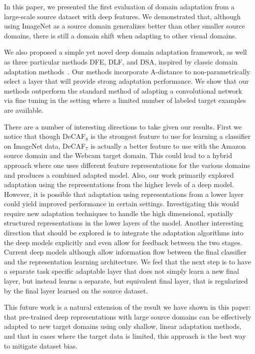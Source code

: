 In this paper, we presented the first evaluation of domain adaptation from a
large-scale source dataset with deep features. We demonstrated that, although
using ImageNet as a source domain generalizes better than other smaller source
domains, there is still a domain shift when adapting to other visual domains.

We also proposed a simple yet novel deep domain adaptation framework, as well as
three particular methods DFE, DLF, and DSA, inspired by classic domain
adaptation methods~\cite{daume, sa}. Our methods incorporate A-distance to
non-parametrically select a layer that will provide strong adaptation
performance. We show that our methods outperform the standard method of adapting
a convolutional network via fine tuning in the setting where a limited number of
labeled target examples are available.


There are a number of interesting directions to take given our results. First we
notice that though DeCAF$_8$ is the strongest feature to use for learning a
classifier on ImageNet data, DeCAF$_7$ is actually a better feature to use with
the Amazon source domain and the Webcam target domain. This could lead to a
hybrid approach where one uses different feature representations for the various
domains and produces a combined adapted model. Also, our work primarily explored
adaptation using the representations from the higher levels of a deep
model. However, it is possible that adaptation using representations from a
lower layer could yield improved performance in certain settings. Investigating
this would require new adaptation techniques to handle the high dimensional,
spatially structured representations in the lower layers of the model. Another
interesting direction that should be explored is to integrate the adaptation
algorithms into the deep models explicitly and even allow for feedback between
the two stages. Current deep models although allow information flow between the
final classifier and the representation learning architecture. We feel that the
next step is to have a separate task specific adaptable layer that does not
simply learn a new final layer, but instead learns a separate, but equivalent
final layer, that is regularized by the final layer learned on the source
dataset.

This future work is a natural extension of the result we have shown in this
paper: that pre-trained deep representations with large source domains can be
effectively adapted to new target domains using only shallow, linear adaptation
methods, and that in cases where the target data is limited, this approach is
the best way to mitigate dataset bias.
